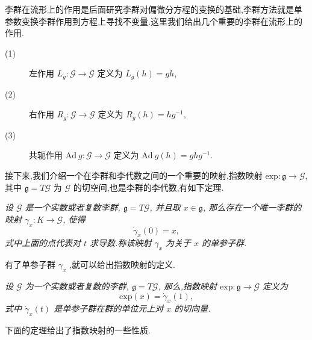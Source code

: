 李群在流形上的作用是后面研究李群对偏微分方程的变换的基础,李群方法就是单参数变换李群作用到方程上寻找不变量.这里我们给出几个重要的李群在流形上的作用.
\begin{description}
	\item[(1)] 左作用 $L_g : \mathcal{G} \to \mathcal{G}$ 定义为 $L_g (h) = gh$,
	\item[(2)] 右作用 $R_g : \mathcal{G} \to \mathcal{G}$ 定义为 $R_g (h) = hg^{-1}$,
	\item[(3)] 共轭作用 $\mbox{Ad}~g: \mathcal{G} \to \mathcal{G}$ 定义为 $\mbox{Ad}~g(h) = ghg^{−1}$.
\end{description}

接下来,我们介绍一个在李群和李代数之间的一个重要的映射,指数映射 $\mathrm{exp}: \mathfrak{g}\to \mathcal{G}$, 其中 $\mathfrak{g}=T\mathcal{G}$ 为 $\mathcal{G}$ 的切空间,也是李群的李代数,有如下定理.
\begin{theorem}
	\emph{设 $\mathcal{G}$ 是一个实数或者复数李群, $\mathfrak{g}=T\mathcal{G}$, 并且取 $x\in\mathfrak{g}$, 那么存在一个唯一李群的映射 $\gamma_x : K \to \mathcal{G}$, 使得
	\begin{equation*}
		\dot{\gamma}_x(0)=x,
	\end{equation*}
式中上面的点代表对 $t$ 求导数.称该映射 $\gamma_x$ 为关于 $x$ 的单参子群.}
\end{theorem}

有了单参子群 $\gamma_x$ ,就可以给出指数映射的定义.
\begin{definition}
	\emph{设 $\mathcal{G}$ 为一个实数或者复数的李群, $\mathfrak{g}=T\mathcal{G}$, 那么,指数映射 $\mathrm{exp}: \mathfrak{g}\to \mathcal{G}$ 定义为
	\begin{equation*}
		\mathrm{exp}(x)=\dot{\gamma}_x(1),
	\end{equation*}
	式中 $\dot{\gamma}_x(t)$ 是单参子群在群的单位元上对 $x$ 的切向量.}
\end{definition}

下面的定理给出了指数映射的一些性质.

